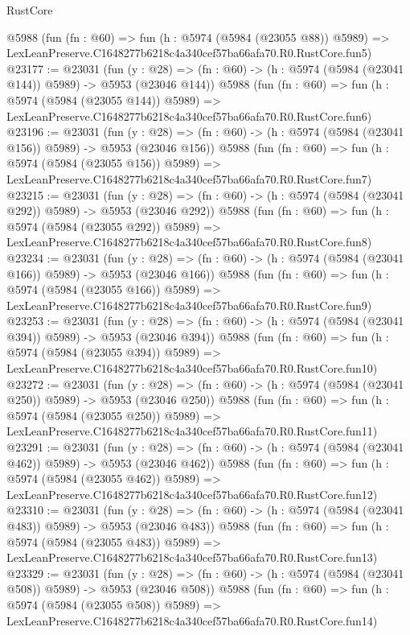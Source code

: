 \begin{lexlean}{RustCore}
\begin{coremodule}
    @5988
    (fun (fn : @60) =>
    fun (h : @5974 (@5984 (@23055 @88)) @5989) =>
    LexLeanPreserve.C1648277b6218c4a340cef57ba66afa70.R0.RustCore.fun5)
@23177 := @23031
    (fun (y : @28) => (fn : @60) -> (h : @5974 (@5984 (@23041 @144)) @5989) -> @5953 (@23046 @144))
    @5988
    (fun (fn : @60) =>
    fun (h : @5974 (@5984 (@23055 @144)) @5989) =>
    LexLeanPreserve.C1648277b6218c4a340cef57ba66afa70.R0.RustCore.fun6)
@23196 := @23031
    (fun (y : @28) => (fn : @60) -> (h : @5974 (@5984 (@23041 @156)) @5989) -> @5953 (@23046 @156))
    @5988
    (fun (fn : @60) =>
    fun (h : @5974 (@5984 (@23055 @156)) @5989) =>
    LexLeanPreserve.C1648277b6218c4a340cef57ba66afa70.R0.RustCore.fun7)
@23215 := @23031
    (fun (y : @28) => (fn : @60) -> (h : @5974 (@5984 (@23041 @292)) @5989) -> @5953 (@23046 @292))
    @5988
    (fun (fn : @60) =>
    fun (h : @5974 (@5984 (@23055 @292)) @5989) =>
    LexLeanPreserve.C1648277b6218c4a340cef57ba66afa70.R0.RustCore.fun8)
@23234 := @23031
    (fun (y : @28) => (fn : @60) -> (h : @5974 (@5984 (@23041 @166)) @5989) -> @5953 (@23046 @166))
    @5988
    (fun (fn : @60) =>
    fun (h : @5974 (@5984 (@23055 @166)) @5989) =>
    LexLeanPreserve.C1648277b6218c4a340cef57ba66afa70.R0.RustCore.fun9)
@23253 := @23031
    (fun (y : @28) => (fn : @60) -> (h : @5974 (@5984 (@23041 @394)) @5989) -> @5953 (@23046 @394))
    @5988
    (fun (fn : @60) =>
    fun (h : @5974 (@5984 (@23055 @394)) @5989) =>
    LexLeanPreserve.C1648277b6218c4a340cef57ba66afa70.R0.RustCore.fun10)
@23272 := @23031
    (fun (y : @28) => (fn : @60) -> (h : @5974 (@5984 (@23041 @250)) @5989) -> @5953 (@23046 @250))
    @5988
    (fun (fn : @60) =>
    fun (h : @5974 (@5984 (@23055 @250)) @5989) =>
    LexLeanPreserve.C1648277b6218c4a340cef57ba66afa70.R0.RustCore.fun11)
@23291 := @23031
    (fun (y : @28) => (fn : @60) -> (h : @5974 (@5984 (@23041 @462)) @5989) -> @5953 (@23046 @462))
    @5988
    (fun (fn : @60) =>
    fun (h : @5974 (@5984 (@23055 @462)) @5989) =>
    LexLeanPreserve.C1648277b6218c4a340cef57ba66afa70.R0.RustCore.fun12)
@23310 := @23031
    (fun (y : @28) => (fn : @60) -> (h : @5974 (@5984 (@23041 @483)) @5989) -> @5953 (@23046 @483))
    @5988
    (fun (fn : @60) =>
    fun (h : @5974 (@5984 (@23055 @483)) @5989) =>
    LexLeanPreserve.C1648277b6218c4a340cef57ba66afa70.R0.RustCore.fun13)
@23329 := @23031
    (fun (y : @28) => (fn : @60) -> (h : @5974 (@5984 (@23041 @508)) @5989) -> @5953 (@23046 @508))
    @5988
    (fun (fn : @60) =>
    fun (h : @5974 (@5984 (@23055 @508)) @5989) =>
    LexLeanPreserve.C1648277b6218c4a340cef57ba66afa70.R0.RustCore.fun14)

\end{coremodule}
\end{lexlean}
